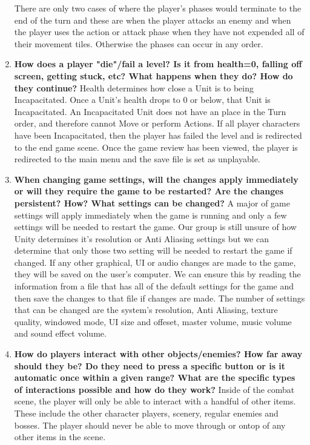 \documentclass[12pt, titlepage]{article}
\begin{document}
\begin{enumerate}
	There are only two cases of where the player's phases would terminate to the end of the turn and these are when the player attacks an enemy and when the player uses the action or attack phase when they have not expended all of their movement tiles. Otherwise the phases can occur in any order.
	\item \textbf{How does a player "die"/fail a level? Is it from health=0, falling off screen, getting stuck, etc? What happens when they do? How do they continue?}
	Health determines how close a Unit is to being Incapacitated. Once a Unit’s health drops to 0 or below, that Unit is Incapacitated. An Incapacitated Unit does not have an place in the Turn order, and therefore cannot Move or perform Actions. If all player characters have been Incapacitated, then the player has failed the level and is redirected to the end game scene. Once the game review has been viewed, the player is redirected to the main menu and the save file is set as unplayable.
	\item \textbf{When changing game settings, will the changes apply immediately or will they require the game to be restarted? Are the changes persistent? How? What settings can be changed?}
	A major of game settings will apply immediately when the game is running and only a few settings will be needed to restart the game. Our group is still unsure of how Unity determines it's resolution or Anti Aliasing settings but we can determine that only those two setting will be needed to restart the game if changed. If any other graphical, UI or audio changes are made to the game, they will be saved on the user's computer. We can ensure this by reading the information from a file that has all of the default settings for the game and then save the changes to that file if changes are made. The number of settings that can be changed are the system's resolution, Anti Aliasing, texture quality, windowed mode, UI size and offeset, master volume, music volume and sound effect volume.
	\item \textbf{How do players interact with other objects/enemies? How far away should they be? Do they need to press a specific button or is it automatic once within a given range? What are the specific types of interactions possible and how do they work?}
	Inside of the combat scene, the player will only be able to interact with a handful of other items. These include the other character players, scenery, regular enemies and bosses. The player should never be able to move through or ontop of any other items in the scene. 

\end{enumerate}
\end{document}
